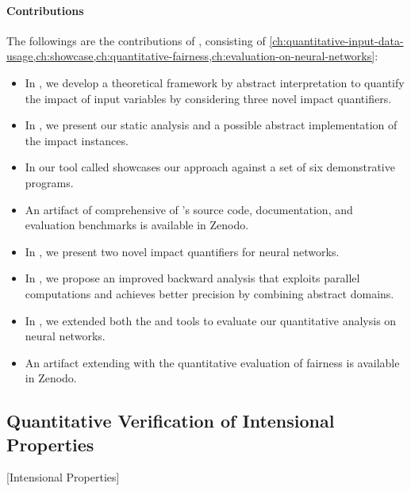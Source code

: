 \paragraph{Contributions}
The followings are the contributions of , consisting of \cref{ch:quantitative-input-data-usage,ch:showcase,ch:quantitative-fairness,ch:evaluation-on-neural-networks}:

\begin{itemize}
  \item In , we develop a theoretical framework by abstract interpretation to quantify the impact of input variables by considering three novel impact quantifiers.
  \item In , we present our static analysis and a possible abstract implementation of the impact instances.
  \item In  our tool called \impatto{} showcases our approach against a set of six demonstrative programs.
  \item An artifact of \impatto{} comprehensive of \impatto's source code, documentation, and evaluation benchmarks is available in Zenodo\sidenote{\impattozenodo}.
  \item In , we present two novel impact quantifiers for neural networks.
  \item In , we propose an improved backward analysis that exploits parallel computations and achieves better precision by combining abstract domains.
  \item In , we extended both the \impatto{} and \libra\sidenote{\libraurl} tools to evaluate our quantitative analysis on neural networks.
  \item An artifact extending \libra{} with the quantitative evaluation of fairness is available in Zenodo\sidenote{\librazenodo}.
\end{itemize}

\subsection{Quantitative Verification of Intensional Properties}[Intensional Properties]


